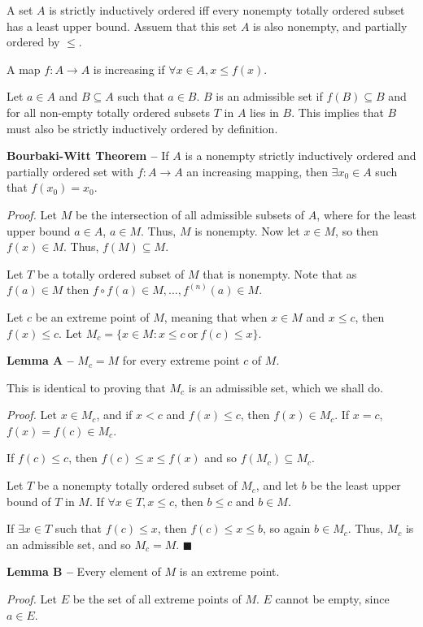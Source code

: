 \documentclass{article}
\begin{document}
A set $A$ is strictly inductively ordered iff every nonempty totally ordered subset has a least upper bound.
Assuem that this set $A$ is also nonempty, and partially ordered by $\leq$.

A map $f: A \to A$ is increasing if $\forall x \in A, x \leq f(x)$.

Let $a \in A$ and $B \subseteq A$ such that $a \in B$. $B$ is an admissible set if $f(B) \subseteq B$ and for all non-empty totally ordered subsets $T$ in $A$ lies in $B$.
This implies that $B$ must also be strictly inductively ordered by definition.

\textbf{Bourbaki-Witt Theorem --} If $A$ is a nonempty strictly inductively ordered and partially ordered set with $f: A \to A$ an increasing mapping, then $\exists x_0 \in A$ such that $f(x_0) = x_0$.

\textit{Proof.} Let $M$ be the intersection of all admissible subsets of $A$, where for the least upper bound $a \in A$, $a \in M$. 
Thus, $M$ is nonempty. Now let $x \in M$, so then $f(x) \in M$. Thus, $f(M) \subseteq M$. 

Let $T$ be a totally ordered subset  of $M$ that is nonempty. Note that as $f(a) \in M$ then $f \circ f(a) \in M, \dots, f^{(n)}(a) \in M$.

Let $c$ be an extreme point of $M$, meaning that when $x \in M$ and $x \le c$, then $f(x) \leq c$. Let $M_c = \{x \in M : x \leq c \: \text{or} \: f(c) \leq x\}$.

\textbf{Lemma A --} $M_c = M$ for every extreme point $c$ of $M$.

This is identical to proving that $M_c$ is an admissible set, which we shall do.

\textit{Proof.} Let $x \in M_c$, and if $x < c$ and $f(x) \leq c$, then $f(x) \in M_c$. If $x = c$, $f(x) = f(c) \in M_c$.

If $f(c) \leq c$, then $f(c) \leq x \leq f(x)$ and so $f(M_c) \subseteq M_c$.

Let $T$ be a nonempty totally ordered subset of $M_c$, and let $b$ be the least upper bound of $T$ in $M$. If $\forall x \in T, x \leq c$, then $b \leq c$ and $b \in M$.

If $\exists x \in T$ such that $f(c) \leq x$, then $f(c) \leq x \leq b$, so again $b \in M_c$. Thus, $M_c$ is an admissible set, and so $M_c = M$. $\blacksquare$

\textbf{Lemma B --} Every element of $M$ is an extreme point.

\textit{Proof.} Let $E$ be the set of all extreme points of $M$. $E$ cannot be empty, since $a \in E$.
\end{document}
